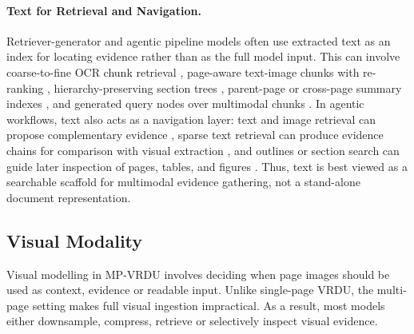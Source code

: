 \documentclass[11pt]{article}
\begin{document}
\paragraph{Text for Retrieval and Navigation.}
Retriever-generator and agentic pipeline models often use extracted text as an index for locating evidence rather than as the full model input. This can involve coarse-to-fine OCR chunk retrieval \cite{zhang2024cream}, page-aware text-image chunks with re-ranking \cite{lopez2025enhancing}, hierarchy-preserving section trees \cite{shin2025multidocfusion}, parent-page or cross-page summary indexes \cite{gong2025mhier}, and generated query nodes over multimodal chunks \cite{zhang2026mldocrag}. In agentic workflows, text also acts as a navigation layer: text and image retrieval can propose complementary evidence \cite{han2025mdocagent}, sparse text retrieval can produce evidence chains for comparison with visual extraction \cite{duan2025m2rag}, and outlines or section search can guide later inspection of pages, tables, and figures \cite{sun2025docagent}. Thus, text is best viewed as a searchable scaffold for multimodal evidence gathering, not a stand-alone document representation.

\subsection{Visual Modality}
Visual modelling in MP-VRDU involves deciding when page images should be used as context, evidence or readable input. Unlike single-page VRDU, the multi-page setting makes full visual ingestion impractical. As a result, most models either downsample, compress, retrieve or selectively inspect visual evidence.

\end{document}
